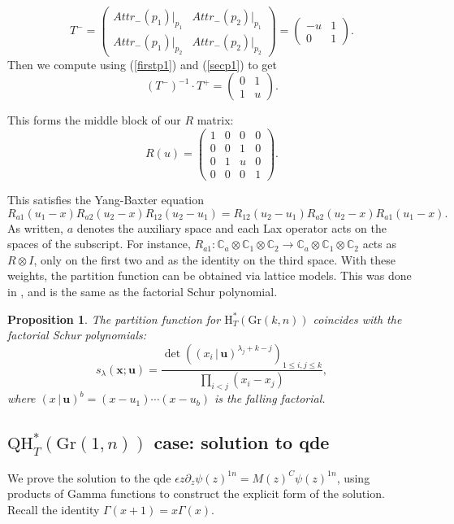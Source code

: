 \documentclass[12pt]{article}
\newtheorem{proposition}[theorem]{Proposition}
\newcommand{\bb}[1]{\mathbb{#1}}
\theoremstyle{plain}
\theoremstyle{definition}
\newcommand{\xb}{\boldsymbol{x}}
\newcommand{\ub}{\boldsymbol{u}}
\begin{document}
\begin{equation}\label{secp1}
    T^- = \begin{pmatrix}
        Attr_- (p_1) |_{p_1} &Attr_- (p_2) |_{p_1}\\
        Attr_- (p_1) |_{p_2}&Attr_- (p_2) |_{p_2}
        \end{pmatrix}= \begin{pmatrix}
        -u&1 \\ 0 &1
    \end{pmatrix}.
\end{equation}
Then we compute using (\ref{firstp1}) and (\ref{secp1}) to get
\begin{equation}
    (T^-)^{-1} \cdot T^+ = \begin{pmatrix}
        0&1\\
        1& u
    \end{pmatrix}.
\end{equation}

This forms the middle block of our $R$ matrix:
$$
R(u)=\begin{pmatrix}
    1&0&0&0\\
    0&0&1&0\\
    0&1&u&0\\
    0&0&0&1
\end{pmatrix}.$$

This satisfies the Yang-Baxter equation 
$$R_{a 1}(u_1-x) R_{a 2}(u_2-x) R_{12} (u_2-u_1)=R_{1 2}(u_2-u_1) R_{a 2}(u_2-x) R_{a 1}(u_1-x). $$
As written, $a$ denotes the auxiliary space and each Lax operator acts on the spaces of the subscript. For instance, $R_{a 1} : \bb{C}_a \otimes \bb{C}_{1}\otimes \bb{C}_{2}\to \bb{C}_a \otimes \bb{C}_{1}\otimes \bb{C}_{2} $ acts as $R \otimes I$, only on the first two and as the identity on the third space.
With these weights, the partition function can be obtained via lattice models. This was done in \cite{aggaC}, and is the same as the factorial Schur polynomial.


\begin{proposition}
The partition function for $\mathrm{H}^*_T(\textrm{Gr}(k,n))$ coincides with the factorial Schur polynomials:
    $$s_\lambda(\xb;\ub) = \frac{\det\left( (x_i\, | \,\ub)^{\lambda_j+k-j} \right)_{1 \leq i, j \leq k}}{\prod_{i<j} (x_i-x_j)},$$
where $ (x \,|\, \ub)^{b} =(x-u_1)\cdots (x-u_b)$ is the falling factorial.
\end{proposition}

\subsection{\texorpdfstring{$\textrm{QH}^*_T(\textrm{Gr}(1,n))$}{QHT} case: solution to qde}
We prove the solution to the qde 
$\epsilon z {\partial }_z \psi(z)^{1n} = M(z)^{C} \psi(z)^{1n}$, using products of Gamma functions to construct the explicit form of the solution. Recall the identity $\Gamma(x+1) = x\Gamma(x)$.
\end{document}
